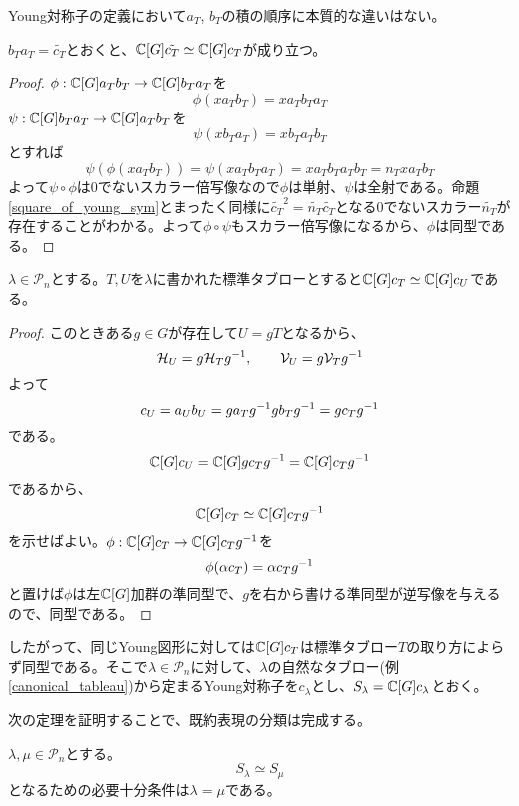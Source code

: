\documentclass{ltjsreport}
\begin{document}
Young対称子の定義において$a_T$, $b_T$の積の順序に本質的な違いはない。

\begin{prop}\label{reverse_young_sym}
  $b_T a_T=\tilde{c_T}$とおくと、$\mathbb{C}[G]\tilde{c_T}\simeq \mathbb{C}[G]c_T$が成り立つ。
\end{prop}

\begin{proof}
  $\phi:\mathbb{C}[G]a_Tb_T\rightarrow\mathbb{C}[G]b_Ta_T$を
  \[
  \phi(xa_Tb_T)=xa_Tb_Ta_T  
  \]
  $\psi:\mathbb{C}[G]b_Ta_T\rightarrow\mathbb{C}[G]a_Tb_T$を
  \[
  \psi(xb_Ta_T)=xb_Ta_Tb_T  
  \]
  とすれば
  \[
  \psi(\phi(xa_Tb_T))=\psi(xa_Tb_Ta_T)=xa_Tb_Ta_Tb_T=n_Txa_Tb_T  
  \]
  よって$\psi\circ\phi$は0でないスカラー倍写像なので$\phi$は単射、$\psi$は全射である。命題\ref{square_of_young_sym}とまったく同様に$\tilde{c_T}^2=\tilde{n_T}\tilde{c_T}$となる0でないスカラー$\tilde{n_T}$が存在することがわかる。よって$\phi\circ\psi$もスカラー倍写像になるから、$\phi$は同型である。
\end{proof}


\begin{prop}
  $\lambda\in\mathcal{P}_n$とする。$T,U$を$\lambda$に書かれた標準タブローとすると$\mathbb{C}[G]c_T\simeq \mathbb{C}[G]c_U$である。
\end{prop}

\begin{proof}
  このときある$g\in G$が存在して$U=gT$となるから、
  \[
  \mathcal{H}_U=g\mathcal{H}_Tg^{-1},\qquad \mathcal{V}_U=g\mathcal{V}_Tg^{-1}  
  \]
  よって
  \[
  c_U=a_Ub_U=ga_Tg^{-1}gb_Tg^{-1}=gc_Tg^{-1}  
  \]
  である。
  \[
  \mathbb{C}[G]c_U=\mathbb{C}[G]gc_Tg^{-1}=\mathbb{C}[G]c_Tg^{-1}  
  \]
  であるから、
  \[
  \mathbb{C}[G]c_T\simeq \mathbb{C}[G]c_Tg^{-1}  
  \]
  を示せばよい。$\phi:\mathbb{C}[G]c_T\rightarrow\mathbb{C}[G]c_Tg^{-1}$を
  \[
  \phi(\alpha c_T)=\alpha c_Tg^{-1}  
  \]
  と置けば$\phi$は左$\mathbb{C}[G]$加群の準同型で、$g$を右から書ける準同型が逆写像を与えるので、同型である。
\end{proof}


したがって、同じYoung図形に対しては$\mathbb{C}[G]c_T$は標準タブロー$T$の取り方によらず同型である。そこで$\lambda\in\mathcal{P}_n$に対して、$\lambda$の自然なタブロー(例\ref{canonical_tableau})から定まるYoung対称子を$c_\lambda$とし、$S_\lambda=\mathbb{C}[G]c_\lambda$とおく。





次の定理を証明することで、既約表現の分類は完成する。

\begin{theo}\label{young_and_irr_rep}
  $\lambda,\mu\in\mathcal{P}_n$とする。
  \[
  S_\lambda\simeq S_\mu 
  \]
  となるための必要十分条件は$\lambda=\mu$である。
\end{theo}
\end{document}
